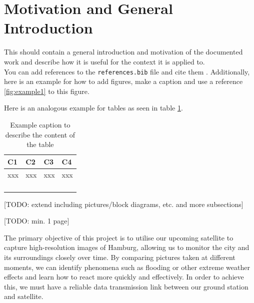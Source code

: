 \documentclass{scrartcl}
\newcommand{\TODO}[1]{{\color{red} [TODO: #1]}}
\begin{document}
\newpage


\section{Motivation and General Introduction}

This should contain a general introduction and motivation of the documented work and describe how it is useful for the context it is applied to.\\

You can add references to the \texttt{references.bib} file and cite them \cite{greenwade93}.
Additionally, here is an example for how to add figures, make a caption and use a reference \ref{fig:example1} to this figure.



Here is an analogous example for tables as seen in table \ref{tab:example1}.

\begin{table}[h]
\caption{Example caption to describe the content of the table}
\begin{tabularx}{\textwidth}{|b|b|b|b|}
\hline
\textbf{C1} & \textbf{C2} & \textbf{C3} & \textbf{C4} \\ \hline \hline
xxx & xxx & xxx  & xxx   \\ \hline
    &    &    &     \\ \hline
    &    &    &     \\ \hline
    &    &    &     \\ \hline
    &    &    &     \\ \hline
\end{tabularx}
\label{tab:example1}
\end{table}

\TODO{extend including pictures/block diagrams, etc. and more subsections}

\TODO{min. 1 page}

The primary objective of this project is to utilise our upcoming satellite to capture high-resolution images of Hamburg, allowing us to monitor the city and its surroundings closely over time. By comparing pictures taken at different moments, we can identify phenomena such as flooding or other extreme weather effects and learn how to react more quickly and effectively. In order to achieve this, we must have a reliable data transmission link between our ground station and satellite.
\end{document}
